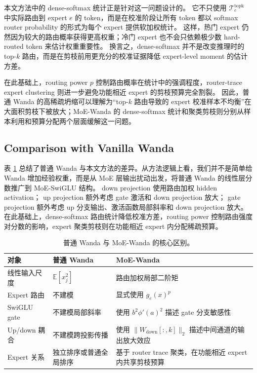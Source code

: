 \documentclass[letterpaper]{article}
\begin{document}
本文方法中的 dense-softmax 统计正是针对这一问题设计的。
它不只使用 $\mathcal{T}^{\mathrm{topk}}_e$ 中实际路由到 expert $e$ 的 token，而是在校准阶段让所有 token 都以 softmax router probability 的形式为每个 expert 提供软加权统计。
这样，热门 expert 仍然因为较大的路由概率获得更高权重；冷门 expert 也不会只依赖极少数 hard-routed token 来估计权重重要性。
换言之，dense-softmax 并不是改变推理时的 top-$k$ 路由，而是在剪枝前用更充分的校准证据降低 expert-level moment 的估计方差。

在此基础上，routing power $p$ 控制路由概率在统计中的强调程度，router-trace expert clustering 则进一步避免功能相近 expert 的剪枝预算完全割裂。
因此，普通 Wanda 的高稀疏坍缩可以理解为“top-$k$ 路由导致的 expert 校准样本不均衡”在大面积剪枝下被放大；MoE-Wanda 的 dense-softmax 统计和聚类剪枝则分别从样本利用和预算分配两个层面缓解这一问题。

\subsection{Comparison with Vanilla Wanda}

表 \ref{tab:score_comparison} 总结了普通 Wanda 与本文方法的差异。从方法逻辑上看，我们并不是简单给 Wanda 增加经验权重，而是从 MoE 层输出扰动出发，将普通 Wanda 的线性层分数推广到 MoE-SwiGLU 结构。
down projection 使用路由加权 hidden activation；
up projection 额外考虑 gate 激活和 down projection 放大；
gate projection 额外考虑 up 分支输出、激活函数局部斜率和 down projection 放大。
在此基础上，dense-softmax 路由统计降低校准方差，routing power 控制路由强度对分数的影响，expert 聚类剪枝则在功能相近 expert 内分配稀疏预算。

\begin{table}[htbp]
\centering
\small
\setlength{\tabcolsep}{5pt}
\renewcommand{\arraystretch}{1.15}
\begin{tabular}{p{} p{} p{}}
\toprule
对象 & 普通 Wanda & MoE-Wanda \\
\midrule
线性输入尺度 & $\mathbb{E}[x_j^2]$ & 路由加权局部二阶矩 \\
Expert 路由 & 不建模 & 显式使用 $g_e(x)^p$ \\
SwiGLU gate & 不建模局部斜率 & 使用 $b^2\phi'(a)^2$ 描述 gate 分支敏感性 \\
Up/down 耦合 & 不建模跨投影传播 & 使用 $\|W_{\mathrm{down}}[:,k]\|_2$ 描述中间通道的输出放大效应 \\
Expert 关系 & 独立排序或普通全局排序 & 基于 router trace 聚类，在功能相近 expert 内共享剪枝预算 \\
\bottomrule
\end{tabular}
\caption{普通 Wanda 与 MoE-Wanda 的核心区别。}
\label{tab:score_comparison}
\end{table}
\end{document}
